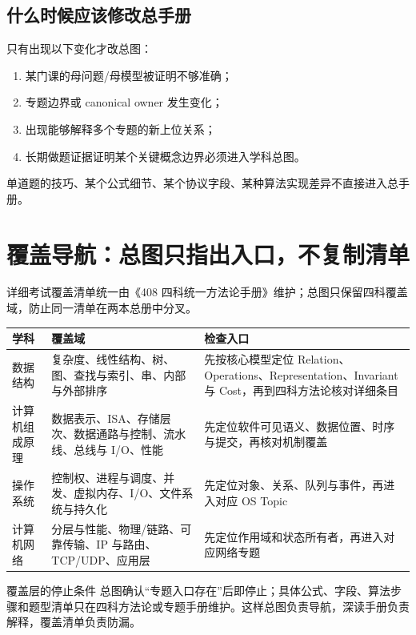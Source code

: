 \documentclass[11pt,a4paper,openany]{ctexbook}
\begin{document}
\section{什么时候应该修改总手册}
只有出现以下变化才改总图：
\begin{enumerate}
  \item 某门课的母问题/母模型被证明不够准确；
  \item 专题边界或 canonical owner 发生变化；
  \item 出现能够解释多个专题的新上位关系；
  \item 长期做题证据证明某个关键概念边界必须进入学科总图。
\end{enumerate}
单道题的技巧、某个公式细节、某个协议字段、某种算法实现差异不直接进入总手册。

\chapter{覆盖导航：总图只指出入口，不复制清单}

详细考试覆盖清单统一由《408 四科统一方法论手册》维护；总图只保留四科覆盖域，防止同一清单在两本总册中分叉。

\begin{longtable}{L{2.2cm}L{5.2cm}L{\dimexpr\linewidth-8.67cm\relax}}
\toprule
\textbf{学科} & \textbf{覆盖域} & \textbf{检查入口}\\
\midrule
数据结构 & 复杂度、线性结构、树、图、查找与索引、串、内部与外部排序 & 先按核心模型定位 Relation、Operations、Representation、Invariant 与 Cost，再到四科方法论核对详细条目\\
计算机组成原理 & 数据表示、ISA、存储层次、数据通路与控制、流水线、总线与 I/O、性能 & 先定位软件可见语义、数据位置、时序与提交，再核对机制覆盖\\
操作系统 & 控制权、进程与调度、并发、虚拟内存、I/O、文件系统与持久化 & 先定位对象、关系、队列与事件，再进入对应 OS Topic\\
计算机网络 & 分层与性能、物理/链路、可靠传输、IP 与路由、TCP/UDP、应用层 & 先定位作用域和状态所有者，再进入对应网络专题\\
\bottomrule
\end{longtable}

\begin{boundarybox}{覆盖层的停止条件}
总图确认“专题入口存在”后即停止；具体公式、字段、算法步骤和题型清单只在四科方法论或专题手册维护。这样总图负责导航，深读手册负责解释，覆盖清单负责防漏。
\end{boundarybox}
\end{document}
